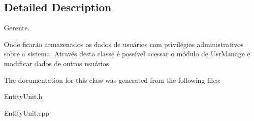 \subsection{Detailed Description}
Gerente. 

Onde ficarão armazenados os dados de usuários com privilégios administrativos sobre o sistema. Através desta classe é possível acessar o módulo de Usr\-Manage e modificar dados de outros usuários. 

The documentation for this class was generated from the following files\-:\begin{DoxyCompactItemize}
\item 
Entity\-Unit.\-h\item 
Entity\-Unit.\-cpp\end{DoxyCompactItemize}
